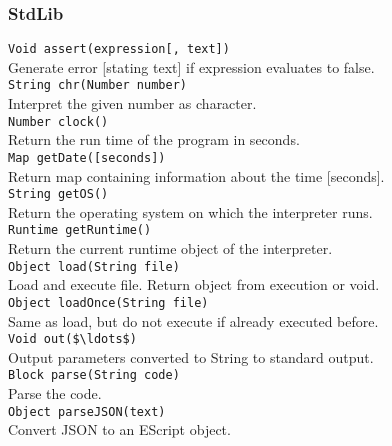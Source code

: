 \documentclass[paper=A4,paper=landscape,pagesize,9pt,DIV=30]{scrartcl}
\begin{document}
\begin{multicols}{3}
\subsubsection*{StdLib}
\lstinline!Void assert(expression[, text])! \\
\hspace*{2mm}Generate error [stating text] if expression evaluates to false. \\
\lstinline!String chr(Number number)! \\
\hspace*{2mm}Interpret the given number as character. \\
\lstinline!Number clock()! \\
\hspace*{2mm}Return the run time of the program in seconds. \\
\lstinline!Map getDate([seconds])! \\
\hspace*{2mm}Return map containing information about the time [seconds]. \\
\lstinline!String getOS()! \\
\hspace*{2mm}Return the operating system on which the interpreter runs. \\
\lstinline!Runtime getRuntime()! \\
\hspace*{2mm}Return the current runtime object of the interpreter. \\
\lstinline!Object load(String file)! \\
\hspace*{2mm}Load and execute file. Return object from execution or void. \\
\lstinline!Object loadOnce(String file)! \\
\hspace*{2mm}Same as load, but do not execute if already executed before. \\
\lstinline!Void out($\ldots$)! \\
\hspace*{2mm}Output parameters converted to String to standard output. \\
\lstinline!Block parse(String code)! \\
\hspace*{2mm}Parse the code. \\
\lstinline!Object parseJSON(text)! \\
\hspace*{2mm}Convert JSON to an EScript object. \\

\end{multicols}
\end{document}
